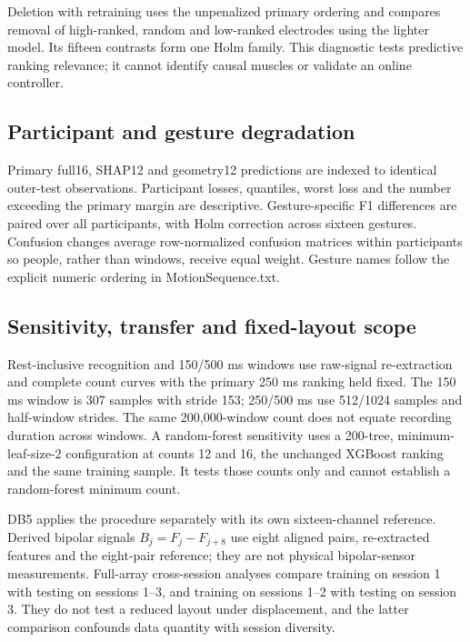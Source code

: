 Deletion with retraining uses the unpenalized primary ordering and compares removal of high-ranked, random and low-ranked electrodes using the lighter model. Its fifteen contrasts form one Holm family. This diagnostic tests predictive ranking relevance; it cannot identify causal muscles or validate an online controller.

\subsection{Participant and gesture degradation}
Primary full16, SHAP12 and geometry12 predictions are indexed to identical outer-test observations. Participant losses, quantiles, worst loss and the number exceeding the primary margin are descriptive. Gesture-specific F1 differences are paired over all participants, with Holm correction across sixteen gestures. Confusion changes average row-normalized confusion matrices within participants so people, rather than windows, receive equal weight. Gesture names follow the explicit numeric ordering in MotionSequence.txt.

\subsection{Sensitivity, transfer and fixed-layout scope}
Rest-inclusive recognition and 150/500 ms windows use raw-signal re-extraction and complete count curves with the primary 250 ms ranking held fixed. The 150 ms window is 307 samples with stride 153; 250/500 ms use 512/1024 samples and half-window strides. The same 200,000-window count does not equate recording duration across windows. A random-forest sensitivity uses a 200-tree, minimum-leaf-size-2 configuration at counts 12 and 16, the unchanged XGBoost ranking and the same training sample. It tests those counts only and cannot establish a random-forest minimum count.

DB5 applies the procedure separately with its own sixteen-channel reference. Derived bipolar signals $B_j=F_j-F_{j+8}$ use eight aligned pairs, re-extracted features and the eight-pair reference; they are not physical bipolar-sensor measurements. Full-array cross-session analyses compare training on session 1 with testing on sessions 1--3, and training on sessions 1--2 with testing on session 3. They do not test a reduced layout under displacement, and the latter comparison confounds data quantity with session diversity.

